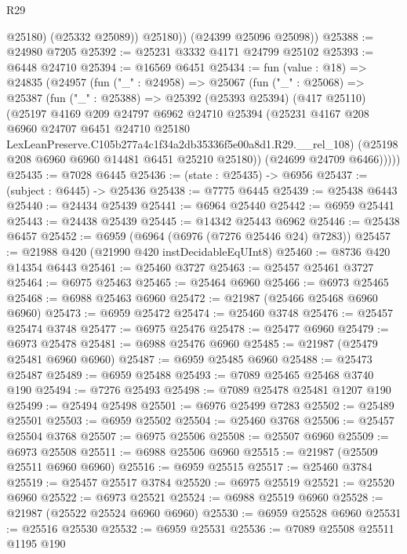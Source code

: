 \begin{lexlean}{R29}
\begin{coremodule}
              @25180)
            (@25332 @25089))
          @25180))
      (@24399 @25096 @25098))
@25388 := @24980 @7205
@25392 := @25231 @3332 @4171 @24799 @25102
@25393 := @6448 @24710
@25394 := @16569 @6451
@25434 := fun (value : @18) =>
  @24835
    (@24957
      (fun ("_" : @24958) =>
      @25067
        (fun ("_" : @25068) =>
        @25387
          (fun ("_" : @25388) =>
          @25392
            (@25393 @25394)
            (@417 @25110)
            (@25197
              @4169
              @209
              @24797
              @6962
              @24710
              @25394
              (@25231
                @4167
                @208
                @6960
                @24707
                @6451
                @24710
                @25180
                LexLeanPreserve.C105b277a4c1f34a2db35336f5e00a8d1.R29.__rel_108)
              (@25198 @208 @6960 @6960 @14481 @6451 @25210 @25180))
            (@24699 @24709 @6466)))))
@25435 := @7028 @6445
@25436 := (state : @25435) -> @6956
@25437 := (subject : @6445) -> @25436
@25438 := @7775 @6445
@25439 := @25438 @6443
@25440 := @24434 @25439
@25441 := @6964 @25440
@25442 := @6959 @25441
@25443 := @24438 @25439
@25445 := @14342 @25443 @6962
@25446 := @25438 @6457
@25452 := @6959 (@6964 (@6976 (@7276 @25446 @24) @7283))
@25457 := @21988 @420 (@21990 @420 instDecidableEqUInt8)
@25460 := @8736 @420 @14354 @6443
@25461 := @25460 @3727
@25463 := @25457 @25461 @3727
@25464 := @6975 @25463
@25465 := @25464 @6960
@25466 := @6973 @25465
@25468 := @6988 @25463 @6960
@25472 := @21987 (@25466 @25468 @6960 @6960)
@25473 := @6959 @25472
@25474 := @25460 @3748
@25476 := @25457 @25474 @3748
@25477 := @6975 @25476
@25478 := @25477 @6960
@25479 := @6973 @25478
@25481 := @6988 @25476 @6960
@25485 := @21987 (@25479 @25481 @6960 @6960)
@25487 := @6959 @25485 @6960
@25488 := @25473 @25487
@25489 := @6959 @25488
@25493 := @7089 @25465 @25468 @3740 @190
@25494 := @7276 @25493
@25498 := @7089 @25478 @25481 @1207 @190
@25499 := @25494 @25498
@25501 := @6976 @25499 @7283
@25502 := @25489 @25501
@25503 := @6959 @25502
@25504 := @25460 @3768
@25506 := @25457 @25504 @3768
@25507 := @6975 @25506
@25508 := @25507 @6960
@25509 := @6973 @25508
@25511 := @6988 @25506 @6960
@25515 := @21987 (@25509 @25511 @6960 @6960)
@25516 := @6959 @25515
@25517 := @25460 @3784
@25519 := @25457 @25517 @3784
@25520 := @6975 @25519
@25521 := @25520 @6960
@25522 := @6973 @25521
@25524 := @6988 @25519 @6960
@25528 := @21987 (@25522 @25524 @6960 @6960)
@25530 := @6959 @25528 @6960
@25531 := @25516 @25530
@25532 := @6959 @25531
@25536 := @7089 @25508 @25511 @1195 @190

\end{coremodule}
\end{lexlean}
